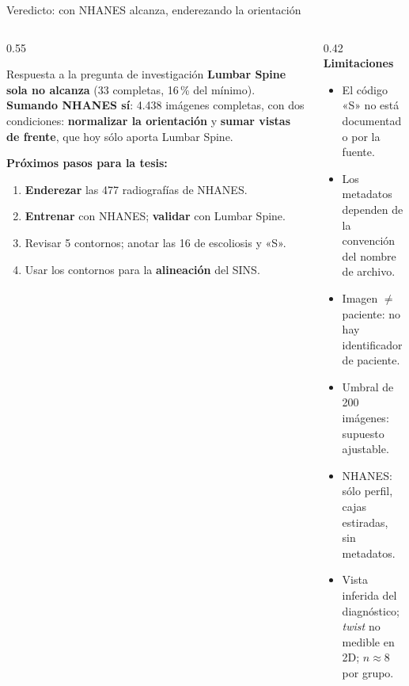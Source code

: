 \documentclass[aspectratio=169,10pt]{beamer}
\begin{document}
\begin{frame}{Veredicto: con NHANES alcanza, enderezando la orientación}
  \begin{columns}[c]
    \begin{column}{0.55\textwidth}
      \begin{block}{Respuesta a la pregunta de investigación}
        \small \textbf{Lumbar Spine sola no alcanza} (33 completas, 16\,\% del mínimo). \textbf{Sumando NHANES sí}: 4.438 imágenes completas, con dos condiciones: \textbf{normalizar la orientación} y \textbf{sumar vistas de frente}, que hoy sólo aporta Lumbar Spine.
      \end{block}
      \vspace{1ex}
      \small
      \textbf{Próximos pasos para la tesis:}
      \footnotesize
      \begin{enumerate}\setlength{\itemsep}{0.1ex}
        \item \textbf{Enderezar} las 477 radiografías de NHANES.
        \item \textbf{Entrenar} con NHANES; \textbf{validar} con Lumbar Spine.
        \item Revisar 5 contornos; anotar las 16 de escoliosis y «S».
        \item Usar los contornos para la \textbf{alineación} del SINS.
      \end{enumerate}
    \end{column}
    \begin{column}{0.42\textwidth}
      \small
      \textbf{Limitaciones}
      \footnotesize
      \begin{itemize}\setlength{\itemsep}{0.1ex}
        \item El código «S» no está documentado por la fuente.
        \item Los metadatos dependen de la convención del nombre de archivo.
        \item Imagen $\neq$ paciente: no hay identificador de paciente.
        \item Umbral de 200 imágenes: supuesto ajustable.
        \item NHANES: sólo perfil, cajas estiradas, sin metadatos.
        \item Vista inferida del diagnóstico; \emph{twist} no medible en 2D; $n \approx 8$ por grupo.
      \end{itemize}
    \end{column}
  \end{columns}
\end{frame}
\end{document}

